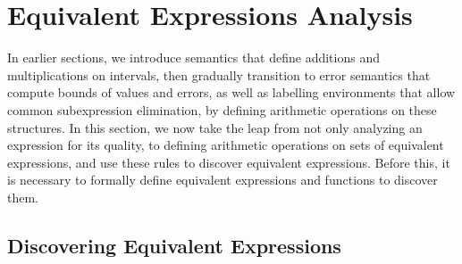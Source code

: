 \section{Equivalent Expressions Analysis}
\label{so:sec:equivalent}

In earlier sections, we introduce semantics that define additions and
multiplications on intervals, then gradually transition to error semantics that
compute bounds of values and errors, as well as labelling environments that
allow common subexpression elimination, by defining arithmetic operations on
these structures. In this section, we now take the leap from not only analyzing
an expression for its quality, to defining arithmetic operations on sets of
equivalent expressions, and use these rules to discover equivalent expressions.
Before this, it is necessary to formally define equivalent expressions and
functions to discover them.

\subsection{Discovering Equivalent Expressions}

